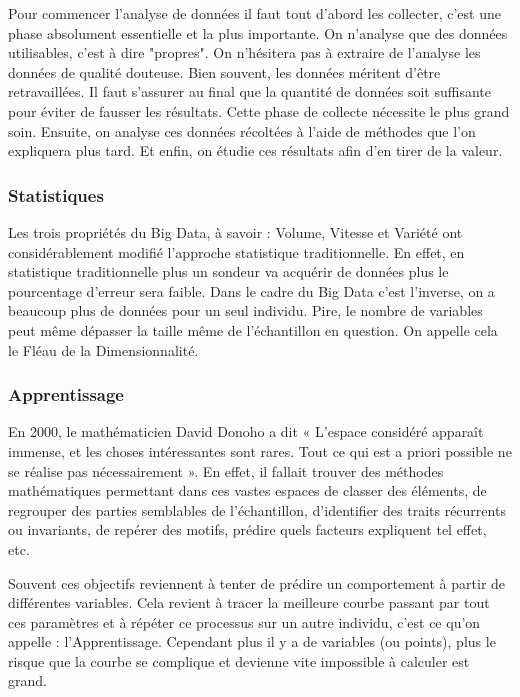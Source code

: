 \documentclass[12pt]{article}
\begin{document}
Pour commencer l'analyse de données il faut tout d'abord les collecter, c'est une phase absolument essentielle et la plus importante. On n'analyse que des données utilisables, c'est à dire "propres". On n'hésitera pas à extraire de l'analyse les données de qualité douteuse. Bien souvent, les données méritent d'être retravaillées. Il faut s'assurer au final que la quantité de données soit suffisante pour éviter de fausser les résultats. Cette phase de collecte nécessite le plus grand soin. Ensuite, on analyse ces données récoltées à l'aide de méthodes que l'on expliquera plus tard. Et enfin, on étudie ces résultats afin d'en tirer de la valeur.
\subsubsection{Statistiques}
Les trois propriétés du Big Data, à savoir : Volume, Vitesse et Variété ont considérablement modifié l'approche statistique traditionnelle. En effet, en statistique traditionnelle plus un sondeur va acquérir de données plus le pourcentage d'erreur sera faible. Dans le cadre du Big Data c'est l'inverse, on a beaucoup plus de données pour un seul individu. Pire, le nombre de variables peut même dépasser la taille même de l'échantillon en question. On appelle cela le Fléau de la Dimensionnalité.
\subsubsection{Apprentissage}
En 2000, le mathématicien David Donoho a dit « L'espace considéré apparaît immense, et les choses intéressantes sont rares. Tout ce qui est a priori possible ne se réalise pas nécessairement ». En effet, il fallait trouver des méthodes mathématiques permettant dans ces vastes espaces de classer des éléments, de regrouper des parties semblables de l'échantillon, d'identifier des traits récurrents ou invariants, de repérer des motifs, prédire quels facteurs expliquent tel effet, etc.\par
Souvent ces objectifs reviennent à tenter de prédire un comportement à partir de différentes variables. Cela revient à tracer la meilleure courbe passant par tout ces paramètres et à répéter ce processus sur un autre individu, c'est ce qu'on appelle : l'Apprentissage. Cependant plus il y a de variables (ou points), plus le risque que la courbe se complique et devienne vite impossible à calculer est grand.
\end{document}
